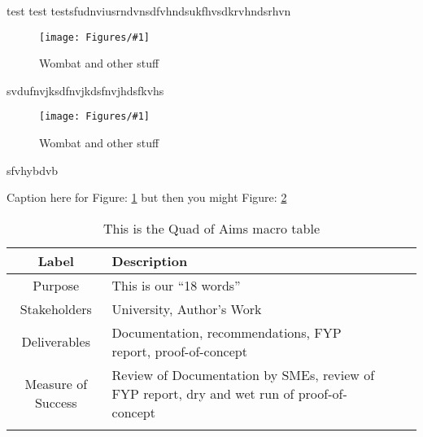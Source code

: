 \documentclass{article}
\newcommand{\fref}[1]
{
	Figure: \ref{#1}
}
\newcommand{\myplot}[2]{
	\begin{figure}
		\centering
		\texttt{[image: Figures/\#1]}  
		\caption{#2}
		\label{#1}
	\end{figure}
}
\newcommand{\mytable}[4]{
    \begin{table}[h]
        \begin{center}
            \caption{#2}\label{tab:#1}
            {\footnotesize
                \begin{tabular}{c l l l|}
                    \hline\hline #3 \hline 
                    #4
                    \\ \hline
                \end{tabular}
            }
        \end{center}
    \end{table}
}
\begin{document}
test test testsfudnviusrndvnsdfvhndsukfhvsdkrvhndsrhvn
\myplot{n2analysis.PNG}{Wombat and other stuff}

svdufnvjksdfnvjkdsfnvjhdsfkvhs

\myplot{InputOutput.PNG}{Wombat and other stuff}
sfvhybdvb

Caption here for \fref{n2analysis.PNG} but then you might \fref{InputOutput.PNG}


\mytable{QuadOfAims}{This is the Quad of Aims macro table}{Label & Description \\ }{
Purpose & This is our “18 words” \\
Stakeholders & University, Author’s Work \\
Deliverables & Documentation, recommendations, FYP report, proof-of-concept \\
Measure of Success & Review of Documentation by SMEs, review of FYP report, dry and wet run of proof-of-concept \\}

\end{document}
